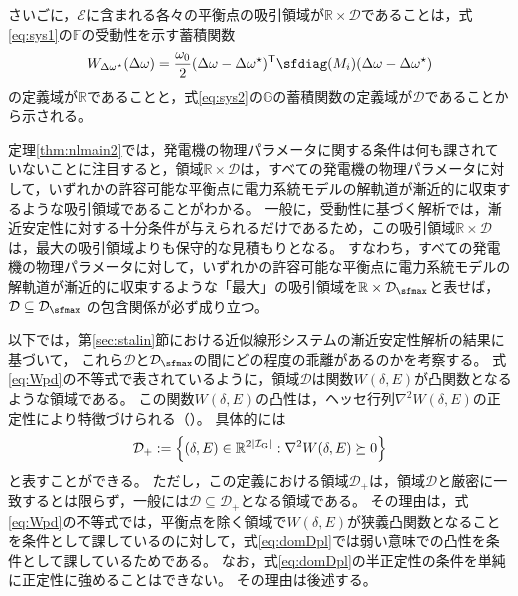 \documentclass[tombow,dvipdfmx]{corona-a5}
\begin{document}
\begin{証明}
さいごに，$\mathcal{E}$に含まれる各々の平衡点の吸引領域が$\mathbb{R}\times \mathcal{D}$であることは，式\ref{eq:sys1}の$\mathds{F}$の受動性を示す蓄積関数
\begin{align*}
W_{\Delta \omega^{\star}}(\Delta \omega)= \frac{\omega_0}{2}
(\Delta \omega -\Delta \omega^{\star})^{\sf T}
\sfdiag(M_i)
(\Delta \omega -\Delta \omega^{\star})
\end{align*}
の定義域が$\mathbb{R}$であることと，式\ref{eq:sys2}の$\mathds{G}$の蓄積関数の定義域が$\mathcal{D}$であることから示される。
\end{証明}

定理\ref{thm:nlmain2}では，発電機の物理パラメータに関する条件は何も課されていないことに注目すると，領域$\mathbb{R}\times \mathcal{D}$は，すべての発電機の物理パラメータに対して，いずれかの許容可能な平衡点に電力系統モデルの解軌道が漸近的に収束するような吸引領域であることがわかる。
一般に，受動性に基づく解析では，漸近安定性に対する十分条件が与えられるだけであるため，この吸引領域$\mathbb{R}\times \mathcal{D}$は，最大の吸引領域よりも保守的な見積もりとなる。
すなわち，すべての発電機の物理パラメータに対して，いずれかの許容可能な平衡点に電力系統モデルの解軌道が漸近的に収束するような「最大」の吸引領域を$\mathbb{R}\times\mathcal{D}_{\sfmax}$と表せば，
$\mathcal{D} \subseteq \mathcal{D}_{\sfmax}$
の包含関係が必ず成り立つ。

以下では，第\ref{sec:stalin}節における近似線形システムの漸近安定性解析の結果に基づいて，
これら$\mathcal{D}$と$\mathcal{D}_{\sfmax}$の間にどの程度の乖離があるのかを考察する。
式\ref{eq:Wpd}の不等式で表されているように，領域$\mathcal{D}$は関数$W(\delta,E)$が凸関数となるような領域である。
この関数$W(\delta,E)$の凸性は，ヘッセ行列$\nabla^2 W(\delta,E)$の正定性により特徴づけられる（）。
具体的には
\begin{align}\label{eq:domDpl}
\mathcal{D}_{+}:= \left\{
(\delta, E) \in \mathbb{R}^{2 |\mathcal{I}_{\rm G}|}  :
\nabla^2 W(\delta,E) \succeq 0
\right\}
\end{align}
と表すことができる。
ただし，この定義における領域$\mathcal{D}_{+}$は，領域$\mathcal{D}$と厳密に一致するとは限らず，一般には$\mathcal{D} \subseteq \mathcal{D}_{+}$となる領域である。
その理由は，式\ref{eq:Wpd}の不等式では，平衡点を除く領域で$W(\delta,E)$が狭義凸関数となることを条件として課しているのに対して，式\ref{eq:domDpl}では弱い意味での凸性を条件として課しているためである。
なお，式\ref{eq:domDpl}の半正定性の条件を単純に正定性に強めることはできない。
その理由は後述する。
\end{document}
